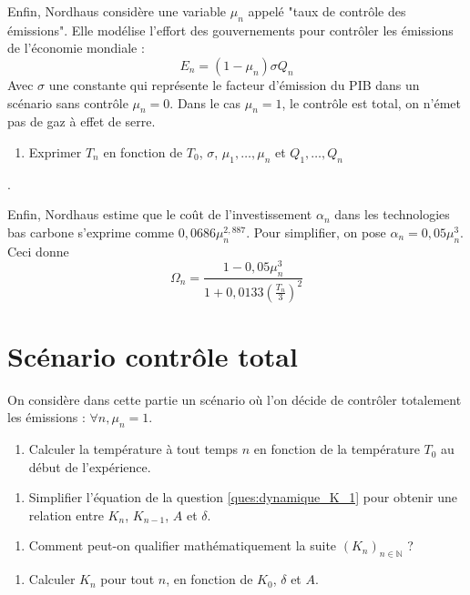 \documentclass[12pt]{article}
\newcommand{\ques}[1]{\begin{enumerate}[resume]
\item  #1
\end{enumerate}}
\newcommand{\rep}[1]{\textit{Réponse :} #1 \\}
\renewcommand{\rep}[1]{ }
\theoremstyle{remark}
\def\NN{\mathbb{N}}
\begin{document}
Enfin, Nordhaus considère une variable $\mu_n$ appelé "taux de contrôle des émissions".
Elle modélise l'effort des gouvernements pour contrôler les émissions de l'économie mondiale :
\begin{equation*}
E_n=(1-\mu_n)\sigma Q_n
\end{equation*}
Avec $\sigma$ une constante qui représente le facteur d'émission du PIB dans un scénario sans contrôle $\mu_n=0$. 
Dans le cas $\mu_n=1$, le contrôle est total, on n'émet pas de gaz à effet de serre.
\ques{Exprimer $T_n$ en fonction de $T_0$, $\sigma$, $\mu_1, \dots, \mu_n$ et $Q_1, \dots ,Q_n$}.
\rep{\begin{equation*}T_n= T_0+\frac{\sigma}{2000} \sum_{k=1}^n (1-\mu_k) Q_k  \end{equation*}}

Enfin, Nordhaus estime que le coût de l'investissement $\alpha_n$ dans les technologies bas carbone s'exprime comme $0,0686 \mu_n^{2,887}$. Pour simplifier, on pose $\alpha_n = 0,05\mu_n^3$. Ceci donne 
\begin{equation*}
\Omega_n = \frac{1-0,05\mu_n^3}{1+0,0133 (\frac{T_n}{3})^2}
\end{equation*}

\section{Scénario contrôle total}
On considère dans cette partie un scénario où l'on décide de contrôler totalement les émissions : $\forall n, \mu_n=1$.
\ques{Calculer la température à tout temps $n$ en fonction de la température $T_0$ au début de l'expérience. }
\rep{$\forall n, T_n =T_0 = 0,8$°C.}

\ques{Simplifier l'équation de la question \ref{ques:dynamique_K_1} pour obtenir une relation entre $K_n$, $K_{n-1}$, $A$ et $\delta$.\label{ques:dynamique_K_2} }
\rep{
\begin{equation*}
\forall n, \quad \Omega_n = \frac{1-0,05}{1+0,0133 (\frac{T_0}{3})}^2=\frac{0,95}{1,000945778}=0,9491
\end{equation*}
\begin{equation*}
\forall n, \quad  K_n = \frac{1- \delta}{1- 0,2373 A} K_{n-1}
\end{equation*}
}

\ques{Comment peut-on qualifier mathématiquement la suite $(K_n)_{n\in \NN}$ ? \label{ques:suite_geo}}
\rep{$(K_n)_{n\in \NN}$ est une suite géométrique de raison $\frac{1- \delta}{1- 0,2373 A}$.}

\ques{Calculer $K_n$ pour tout $n$, en fonction de $K_0$, $\delta$ et $A$.}
\rep{\begin{equation*}
\forall n, \quad  K_n = K_0 \big(\frac{1- \delta}{1- 0,2373 A}\big)^n 
\end{equation*}}
\end{document}
